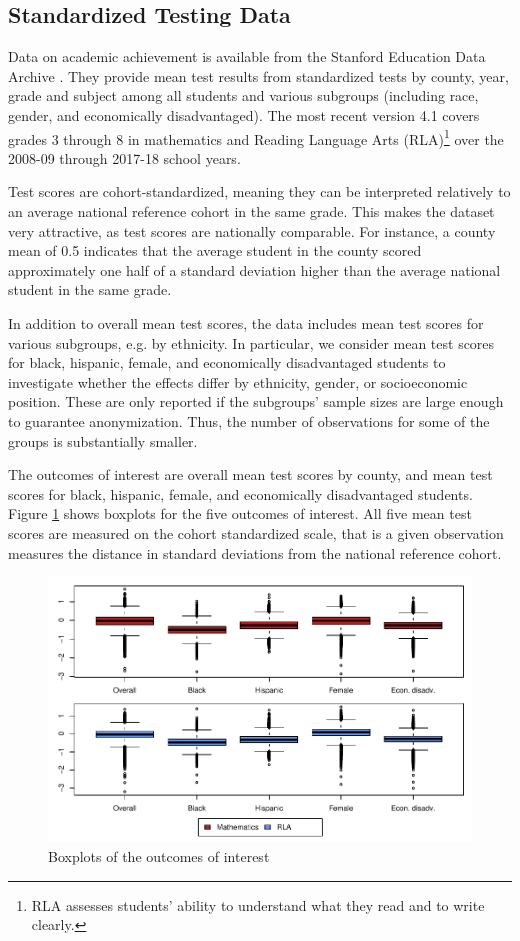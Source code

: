 \subsection{Standardized Testing Data}

Data on academic achievement is available from the Stanford Education Data Archive \citep{SEDA}. They provide mean test results from standardized tests by county, year, grade and subject among all students and various subgroups (including race, gender, and economically disadvantaged). The most recent version 4.1 covers grades 3 through 8 in mathematics and Reading Language Arts (RLA)\footnote{RLA assesses students' ability to understand what they read and to write clearly.} over the 2008-09 through 2017-18 school years.

Test scores are cohort-standardized, meaning they can be interpreted relatively to an average national reference cohort in the same grade. This makes the dataset very attractive, as test scores are nationally comparable. For instance, a county mean of 0.5 indicates that the average student in the county scored approximately one half of a standard deviation higher than the average national student in the same grade.

In addition to overall mean test scores, the data includes mean test scores for various subgroups, e.g. by ethnicity. In particular, we consider mean test scores for black, hispanic, female, and economically disadvantaged students to investigate whether the effects differ by ethnicity, gender, or socioeconomic position. These are only reported if the subgroups' sample sizes are large enough to guarantee anonymization. Thus, the number of observations for some of the groups is substantially smaller.

The outcomes of interest are overall mean test scores by county, and mean test scores for black, hispanic, female, and economically disadvantaged students. Figure \ref{DepVarsBoxplot} shows boxplots for the five outcomes of interest. All five mean test scores are measured on the cohort standardized scale, that is a given observation measures the distance in standard deviations from the national reference cohort. 

\begin{figure}[!h]
	\centering
	\includegraphics[scale=1]{"../Code & Data/DepVarsBoxplot.pdf"}
	\caption{Boxplots of the outcomes of interest}
	\label{DepVarsBoxplot}
\end{figure}


